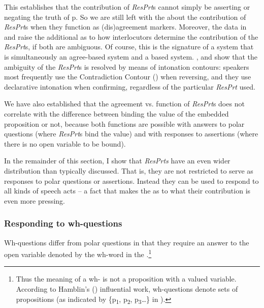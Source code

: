 \documentclass[output=paper]{LSP/langsci}
\begin{document}
This establishes that the contribution of \textit{ResPrt}s cannot simply be asserting or negating the truth of p. So we are still left with the  about the contribution of \textit{ResPrt}s when they function as (dis)agreement markers. Moreover, the data in  and  raise the additional  as to how interlocutors determine the contribution of the \textit{ResPrt}s, if both are ambiguous. Of course, this is the signature of a system that is simultaneously an agree-based system and a  based system. \citet{GoodhueWagner2015}, and \citet{GoodhueEtAl2013} show that the ambiguity of the \textit{ResPrt}s is resolved by means of intonation contours: speakers most frequently use the Contradiction Contour (\citealt{LibermanSag1974}) when reversing, and they use declarative intonation when confirming, regardless of the particular \textit{ResPrt} used.

We have also established that the agreement vs.  function of \textit{ResPrt}s does not correlate with the difference between binding the  value of the embedded proposition or not, because both functions are possible with answers to polar questions (where \textit{ResPrt}s bind the  value) and with responses to assertions (where there is no open  variable to be bound).

In the remainder of this section, I show that \textit{ResPrts} have an even wider distribution than typically discussed.
That is, they are not restricted to serve as responses to polar questions or assertions. Instead they can be used to respond to all kinds of speech acts – a fact that makes the  as to what their contribution is even more pressing.  

\subsubsection{{Responding to wh-questions}}

Wh-questions differ from polar questions in that they require an answer to the open variable denoted by the wh-word in the .\footnote{Thus the meaning of a wh- is not a proposition with a valued  variable.
According to Hamblin’s (\citeyear{Hamblin1958,Hamblin1973}) influential work, wh-questions denote sets of propositions (as indicated by \{p\textsubscript{1}, p\textsubscript{2}, p\textsubscript{3}…\} in ).}  
\end{document}
